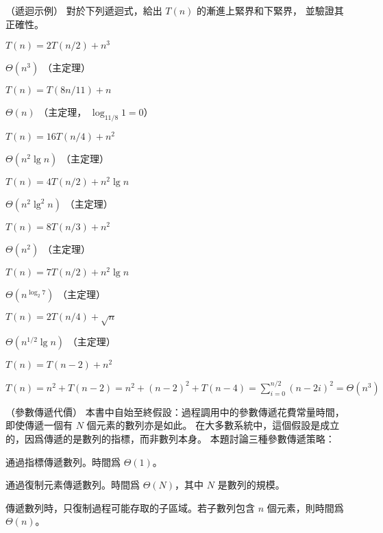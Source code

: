 \startsubject[
  title={Problems},
]

\startPROBLEM（遞迴示例）
對於下列遞迴式，給出 $T(n)$ 的漸進上緊界和下緊界，
並驗證其正確性。
\startigBase[n]
\item $T(n) = 2 T(n/2) + n^3$

\startANSWER
$\Theta(n^3)$ （主定理）
\stopANSWER

\item $T(n) = T(8n/11) + n$

\startANSWER
$\Theta(n)$ （主定理， $\log_{11/8} 1 = 0$）
\stopANSWER

\item $T(n) = 16 T(n/4) + n^2$

\startANSWER
$\Theta(n^2\lg n)$ （主定理）
\stopANSWER

\item $T(n) = 4 T(n/2) + n^2\lg n$

\startANSWER
$\Theta(n^2\lg^2 n)$ （主定理）
\stopANSWER

\item $T(n) = 8 T(n/3) + n^2$

\startANSWER
$\Theta(n^2)$ （主定理）
\stopANSWER

\item $T(n) = 7 T(n/2) + n^2\lg n$

\startANSWER
$\Theta(n^{\log_2 7})$ （主定理）
\stopANSWER

\item $T(n)=2T(n/4) + \sqrt{n}$

\startANSWER
$\Theta(n^{1/2}\lg n)$ （主定理）
\stopANSWER

\item $T(n) = T(n-2) + n^2$

\startANSWER
$T(n) = n^2 + T(n-2)
  = n^2 + (n-2)^2 + T(n-4)
  = \sum_{i=0}^{n/2}(n-2i)^2 = \Theta(n^3)$
\stopANSWER
\stopigBase
\stopPROBLEM

\startPROBLEM（參數傳遞代價）
本書中自始至終假設：過程調用中的參數傳遞花費常量時間，
即使傳遞一個有 $N$ 個元素的數列亦是如此。
在大多數系統中，這個假設是成立的，因爲傳遞的是數列的指標，而非數列本身。
本題討論三種參數傳遞策略：
\startigBase[n]
\item 通過指標傳遞數列。時間爲 $\Theta(1)$。
\item 通過復制元素傳遞數列。時間爲 $\Theta(N)$，其中 $N$ 是數列的規模。
\item 傳遞數列時，只復制過程可能存取的子區域。若子數列包含 $n$ 個元素，則時間爲 $\Theta(n)$。
\stopigBase

